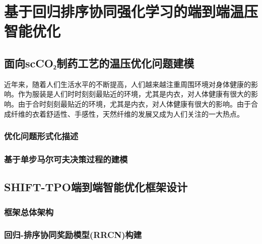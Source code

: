 \chapter{基于回归排序协同强化学习的端到端温压智能优化}
\label{chap:intro}
\section{面向scCO₂制药工艺的温压优化问题建模}

近年来，随着人们生活水平的不断提高，人们越来越注重周围环境对身体健康的影响。作为服装是人们时时刻刻最贴近的环境，尤其是内衣，对人体健康有很大的影响。由于合时刻刻最贴近的环境，尤其是内衣，对人体健康有很大的影响。由于合成纤维的衣着舒适性、手感性，天然纤维的发展又成为人们关注的一大热点。\supercite{Takahashi1996Structure,Xia2002Analysis,Jiang1989,Mao2000Motion,Feng1998}

\subsection{优化问题形式化描述}

\subsection{基于单步马尔可夫决策过程的建模}

\section{SHIFT-TPO端到端智能优化框架设计}

\subsection{框架总体架构 }

\subsection{回归-排序协同奖励模型(RRCN)构建}

